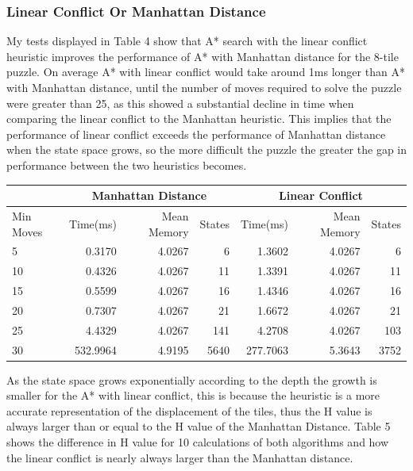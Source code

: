 \documentclass[progress]{cmpreport}
\begin{document}
\subsubsection{Linear Conflict Or Manhattan Distance}
My tests displayed in Table 4 show that A* search with the linear conflict heuristic improves the performance of A* with Manhattan distance for the 8-tile puzzle. On average A* with linear conflict would take around 1ms longer than A* with Manhattan distance, until the number of moves required to solve the puzzle were greater than 25, as this showed a substantial decline in time when comparing the linear conflict to the Manhattan heuristic. This implies that the performance of linear conflict exceeds the performance of Manhattan distance when the state space grows, so the more difficult the puzzle the greater the gap in performance between the two heuristics becomes.
\begin{center}
	\begin{tabular}{|l|r|r|r|r|r|r|} \cline{2-7}
		
		\multicolumn{1}{c}{} & \multicolumn{3}{|c|}{Manhattan Distance} &
		\multicolumn{3}{|c|}{Linear Conflict} \\ \hline
		Min Moves & Time(ms) & Mean Memory & States & Time(ms) & Mean Memory & States \\	\hline \hline
		5 & 0.3170 & 4.0267 & 6               & 1.3602 & 4.0267 & 6 \\
		10 & 0.4326 & 4.0267 & 11             & 1.3391 & 4.0267 & 11 \\
		15 & 0.5599 & 4.0267 & 16             & 1.4346 & 4.0267 & 16 \\
		20 & 0.7307 & 4.0267 & 21             & 1.6672 & 4.0267 & 21 \\
		25 & 4.4329 & 4.0267 & 141            & 4.2708 & 4.0267 & 103\\
		30 & 532.9964 & 4.9195 & 5640         & 277.7063& 5.3643 &3752\\
		\hline
	
	\end{tabular}

\end{center}
 As the state space grows exponentially according to the depth the growth is smaller for the A* with linear conflict, this is because the heuristic is a more accurate representation of the displacement of the tiles, thus the H value is always larger than or equal to the H value of the Manhattan Distance. Table 5 shows the difference in H value for 10 calculations of both algorithms and how the linear conflict is nearly always larger than the Manhattan distance.
 
\end{document}
